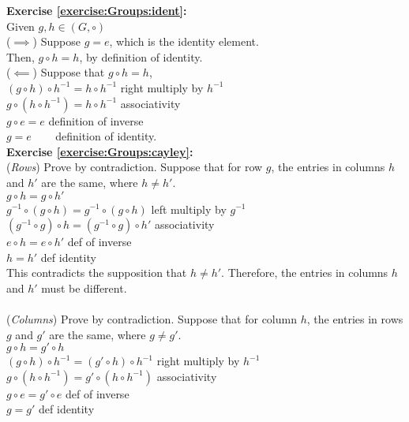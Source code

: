 \noindent\textbf{Exercise \ref{exercise:Groups:ident}:}
\\
Given $g, h \in (G, \circ)$\\
($\implies$) Suppose $g = e$, which is the identity element.\\
Then, $g \circ h = h$, by definition of identity.\\
($\impliedby$) Suppose that $g \circ h = h$,\\
$(g \circ h) \circ h^{-1} = h \circ h^{-1}$ \quad right multiply by $h^{-1}$\\
$g \circ (h \circ h^{-1}) = h \circ h^{-1}$ \quad associativity\\
$g \circ e = e$ \quad definition of inverse \\
$g = e$ \quad ~~~ definition of identity.
\\

\noindent\textbf{Exercise \ref{exercise:Groups:cayley}:}
\\
(\emph{Rows})  Prove by contradiction. Suppose that for row $g$,  the entries in columns $h$ and $h'$ are the same, where $h \neq h'$.\\

\noindent
$g \circ h = g \circ h'$\\
$g^{-1} \circ (g \circ h) = g^{-1} \circ (g \circ h)$ \quad left multiply by $g^{-1}$\\
$(g^{-1} \circ g) \circ h = (g^{-1} \circ g) \circ h'$ \quad associativity\\
$e \circ h = e \circ h'$ \quad def of inverse\\
$h = h'$ \quad def identity\\

\noindent
This contradicts the supposition that $h \neq h'$.  Therefore, the entries in columns $h$ and $h'$ must be different.\\
\\
(\emph{Columns}) Prove by contradiction. Suppose that for column $h$,  the entries in rows $g$ and $g'$ are the same, where $g \neq g'$.\\

\noindent
$g \circ h = g' \circ h$\\
$(g \circ h) \circ h^{-1} = (g' \circ h) \circ h^{-1}$ \quad right multiply by $h^{-1}$\\
$g \circ (h \circ h^{-1}) = g' \circ (h \circ h^{-1})$ \quad associativity\\
$g \circ e = g' \circ e$ \quad def of inverse\\
$g = g'$ \quad def identity\\

